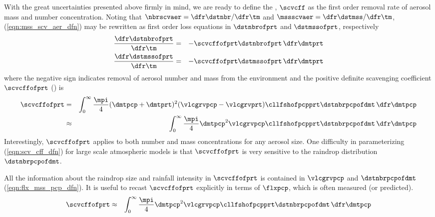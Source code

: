 \documentclass[12pt,twoside]{book}
\begin{document}
With the great uncertainties presented above firmly in mind, we are
ready to define the , 
$\scvcff$ as the first order removal rate of aerosol mass and number
concentration.
Noting that $\nbrscvaer = \dfr\dstnbr/\dfr\tm$ and
$\mssscvaer = \dfr\dstmss/\dfr\tm$, (\ref{eqn:mss_scv_aer_dfn})
may be rewritten as first order loss equations in $\dstnbrofprt$ and
$\dstmssofprt$, respectively 
\begin{eqnarray}
\label{eqn:dst_scv_nbr_dfn}
\frac{\dfr\dstnbrofprt}{\dfr\tm} & = & 
-\scvcffofprt \dstnbrofprt \,\dfr\dmtprt \\
\label{eqn:dst_scv_mss_dfn}
\frac{\dfr\dstmssofprt}{\dfr\tm} & = & 
-\scvcffofprt \dstmssofprt \,\dfr\dmtprt
\end{eqnarray}
where the negative sign indicates removal of aerosol number and mass
from the environment and the positive definite scavenging coefficient
$\scvcffofprt$ (\xs) is  
\begin{eqnarray}
\scvcffofprt & = &
\int_{0}^{\infty} \frac{\mpi}{4} 
( \dmtpcp + \dmtprt)^{2} ( \vlcgrvpcp - \vlcgrvprt )
\cllfshofpcpprt \dstnbrpcpofdmt \,\dfr\dmtpcp \\
& \approx &
\int_{0}^{\infty} \frac{\mpi}{4} 
\dmtpcp^{2} \vlcgrvpcp
\cllfshofpcpprt \dstnbrpcpofdmt \,\dfr\dmtpcp
\label{eqn:scv_cff_dfn}
\end{eqnarray}
Interestingly, $\scvcffofprt$ applies to both  
number and mass concentrations for any aerosol size.
One difficulty in parameterizing (\ref{eqn:scv_cff_dfn}) for large
scale atmospheric models is that $\scvcffofprt$ is very sensitive to
the raindrop distribution $\dstnbrpcpofdmt$.

All the information about the raindrop size and rainfall intensity
in $\scvcffofprt$ is contained in $\vlcgrvpcp$ and $\dstnbrpcpofdmt$ 
(\ref{eqn:flx_mss_pcp_dfn}). 
It is useful to recast $\scvcffofprt$ explicitly in terms of
$\flxpcp$, which is often measured (or predicted).
\begin{eqnarray}
\scvcffofprt & \approx &
\int_{0}^{\infty} \frac{\mpi}{4} 
\dmtpcp^{2} \vlcgrvpcp
\cllfshofpcpprt \dstnbrpcpofdmt \,\dfr\dmtpcp
\label{eqn:scv_cff_pcp_dfn}
\end{eqnarray}
\end{document}
